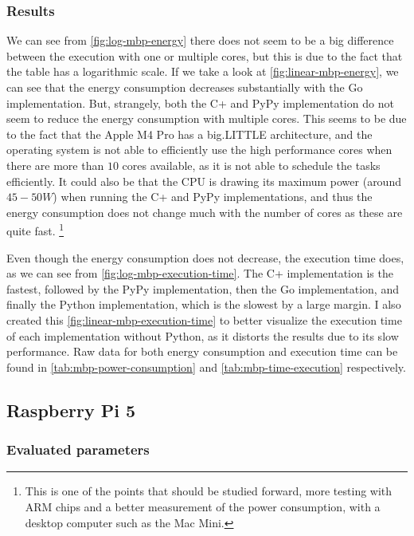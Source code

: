 \subsubsection{Results}





We can see from \autoref{fig:log-mbp-energy} there does not seem to be a big difference between the execution with one or multiple cores, but this is due to the fact that the table has a logarithmic scale. If we take a look at \autoref{fig:linear-mbp-energy}, we can see that the energy consumption decreases substantially with the Go implementation. But, strangely, both the C\++ and PyPy implementation do not seem to reduce the energy consumption with multiple cores. This seems to be due to the fact that the Apple M4 Pro has a big.LITTLE architecture, and the operating system is not able to efficiently use the high performance cores when there are more than $10$ cores available, as it is not able to schedule the tasks efficiently. It could also be that the CPU is drawing its maximum power (around $45-50W$) when running the C\++ and PyPy implementations, and thus the energy consumption does not change much with the number of cores as these are quite fast. \footnote{This is one of the points that should be studied forward, more testing with ARM chips and a better measurement of the power consumption, with a desktop computer such as the Mac Mini.}



Even though the energy consumption does not decrease, the execution time does, as we can see from \autoref{fig:log-mbp-execution-time}. The C\++ implementation is the fastest, followed by the PyPy implementation, then the Go implementation, and finally the Python implementation, which is the slowest by a large margin. I also created this \autoref{fig:linear-mbp-execution-time} to better visualize the execution time of each implementation without Python, as it distorts the results due to its slow performance. Raw data for both energy consumption and execution time can be found in \autoref{tab:mbp-power-consumption} and \autoref{tab:mbp-time-execution} respectively.


\subsection{Raspberry Pi 5}
\subsubsection{Evaluated parameters}
